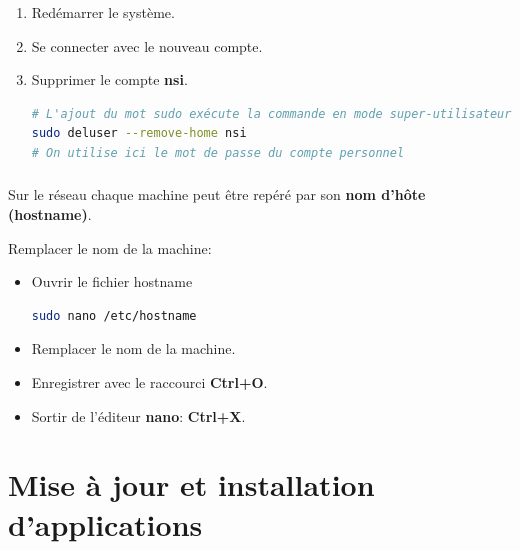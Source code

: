 \documentclass[svgnames,11pt]{beamer}
\begin{document}
\begin{frame}[fragile]
    \frametitle{}

\begin{activite}
\begin{enumerate}
\item Redémarrer le système.
\item Se connecter avec le nouveau compte.
\item Supprimer le compte \textbf{nsi}.
\begin{lstlisting}[language=bash, basicstyle=\ttfamily\small, xleftmargin=1em, xrightmargin=0em]
# L'ajout du mot sudo exécute la commande en mode super-utilisateur.
sudo deluser --remove-home nsi
# On utilise ici le mot de passe du compte personnel
\end{lstlisting}
\end{enumerate}
\end{activite}   

\end{frame}
\begin{frame}[fragile]
    \frametitle{}
    Sur le réseau chaque machine peut être repéré par son \textbf{nom d'hôte (hostname)}.
\begin{activite}
    Remplacer le nom de la machine:
    \begin{itemize}
        \item Ouvrir le fichier hostname
\begin{lstlisting}[language=bash, basicstyle=\ttfamily\small, xleftmargin=1em, xrightmargin=1em]
sudo nano /etc/hostname
\end{lstlisting}
\item Remplacer le nom de la machine.
\item Enregistrer avec le raccourci \textbf{Ctrl+O}.
\item Sortir de l'éditeur \textbf{nano}: \textbf{Ctrl+X}.
    \end{itemize}
\end{activite}

\end{frame}
\section{Mise à jour et installation d'applications}
\end{document}
